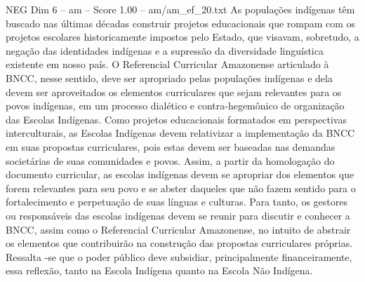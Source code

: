 \begin{textsample}{NEG Dim 6 – am – Score 1.00 – am/am\_ef\_20.txt}
As populações indígenas têm buscado nas últimas décadas construir projetos educacionais que rompam com os projetos escolares historicamente impostos pelo Estado, que visavam, sobretudo, a negação das identidades indígenas e a supressão da diversidade linguística existente em nosso país.
O Referencial Curricular Amazonense articulado à BNCC, nesse sentido, deve ser apropriado pelas populações indígenas e dela devem ser aproveitados os elementos curriculares que sejam relevantes para os povos indígenas, em um processo dialético e contra-hegemônico de organização das Escolas Indígenas.
Como projetos educacionais formatados em perspectivas interculturais, as Escolas Indígenas devem relativizar a implementação da BNCC em suas propostas curriculares, pois estas devem ser baseadas nas demandas societárias de suas comunidades e povos.
Assim, a partir da homologação do documento curricular, as escolas indígenas devem se apropriar dos elementos que forem relevantes para seu povo e se abster daqueles que não fazem sentido para o fortalecimento e perpetuação de suas línguas e culturas.
Para tanto, os gestores ou responsáveis das escolas indígenas devem se reunir para discutir e conhecer a BNCC, assim como o Referencial Curricular Amazonense, no intuito de abstrair os elementos que contribuirão na construção das propostas curriculares próprias.
Ressalta -se que o poder público deve subsidiar, principalmente financeiramente, essa reflexão, tanto na Escola Indígena quanto na Escola Não Indígena.

\end{textsample}
